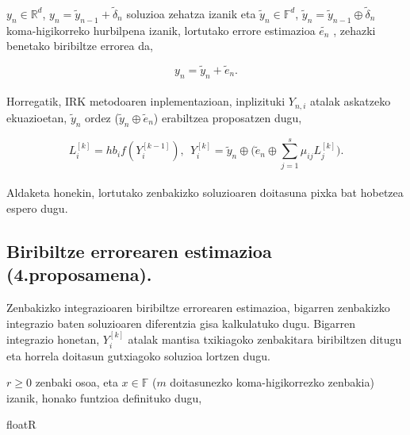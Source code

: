\paragraph*{} $y_n \in \mathbb{R}^{d}$,  $y_n=\tilde y_{n-1}+\tilde \delta_n$ soluzioa zehatza izanik eta $\tilde y_n \in \mathbb{F}^{d}$,  $\tilde y_n=\tilde y_{n-1} \oplus \tilde \delta_n$ koma-higikorreko hurbilpena izanik, lortutako errore estimazioa $\tilde{e_n}$ ,  zehazki benetako biribiltze errorea da,

\begin{equation}
y_n=\tilde {y}_n+\tilde {e}_n. 
\end{equation}

\paragraph*{} Horregatik, IRK metodoaren inplementazioan, inplizituki $Y_{n,i}$ atalak askatzeko ekuazioetan, $\tilde {y}_n$ ordez ($\tilde{y}_n \oplus \tilde{e}_n$) erabiltzea proposatzen dugu,   

\begin{equation}
L_i^{[k]}=hb_if(Y_i^{[k-1]}), \ \ Y_i^{[k]}=\tilde{y}_n \oplus \big(\tilde{e}_n \oplus \sum\limits_{j=1}^{s} \mu_{ij} L_j^{[k]}\big).
\end{equation}

\paragraph{}Aldaketa honekin, lortutako zenbakizko soluzioaren doitasuna pixka bat hobetzea espero dugu. 


\subsection{Biribiltze errorearen estimazioa (4.proposamena).}

Zenbakizko integrazioaren biribiltze errorearen estimazioa, bigarren zenbakizko integrazio baten soluzioaren diferentzia gisa kalkulatuko dugu. Bigarren integrazio honetan, $Y_i^{[k]}$ atalak mantisa txikiagoko zenbakitara biribiltzen ditugu eta horrela doitasun gutxiagoko soluzioa lortzen dugu. 

$r\ge0$ zenbaki osoa, eta $x \in \mathbb{F}$ ($m$ doitasunezko koma-higikorrezko zenbakia) izanik, honako funtzioa definituko dugu,\\

\begin{algorithm}[H]
  \SetAlgoLined\DontPrintSemicolon
  \caption{floatR}
\end{algorithm} 

